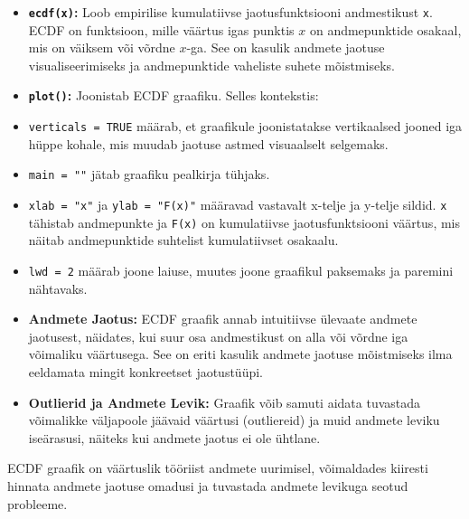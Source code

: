 \documentclass[
]{book}
\begin{document}
\begin{itemize}
\item
  \textbf{\texttt{ecdf(x)}:} Loob empirilise kumulatiivse jaotusfunktsiooni andmestikust \texttt{x}. ECDF on funktsioon, mille väärtus igas punktis \(x\) on andmepunktide osakaal, mis on väiksem või võrdne \(x\)-ga. See on kasulik andmete jaotuse visualiseerimiseks ja andmepunktide vaheliste suhete mõistmiseks.
\item
  \textbf{\texttt{plot()}:} Joonistab ECDF graafiku. Selles kontekstis:
\item
  \texttt{verticals\ =\ TRUE} määrab, et graafikule joonistatakse vertikaalsed jooned iga hüppe kohale, mis muudab jaotuse astmed visuaalselt selgemaks.
\item
  \texttt{main\ =\ ""} jätab graafiku pealkirja tühjaks.
\item
  \texttt{xlab\ =\ "x"} ja \texttt{ylab\ =\ "F(x)"} määravad vastavalt x-telje ja y-telje sildid. \texttt{x} tähistab andmepunkte ja \texttt{F(x)} on kumulatiivse jaotusfunktsiooni väärtus, mis näitab andmepunktide suhtelist kumulatiivset osakaalu.
\item
  \texttt{lwd\ =\ 2} määrab joone laiuse, muutes joone graafikul paksemaks ja paremini nähtavaks.
\item
  \textbf{Andmete Jaotus:} ECDF graafik annab intuitiivse ülevaate andmete jaotusest, näidates, kui suur osa andmestikust on alla või võrdne iga võimaliku väärtusega. See on eriti kasulik andmete jaotuse mõistmiseks ilma eeldamata mingit konkreetset jaotustüüpi.
\item
  \textbf{Outlierid ja Andmete Levik:} Graafik võib samuti aidata tuvastada võimalikke väljapoole jäävaid väärtusi (outliereid) ja muid andmete leviku iseärasusi, näiteks kui andmete jaotus ei ole ühtlane.
\end{itemize}

ECDF graafik on väärtuslik tööriist andmete uurimisel, võimaldades kiiresti hinnata andmete jaotuse omadusi ja tuvastada andmete levikuga seotud probleeme.
\end{document}
